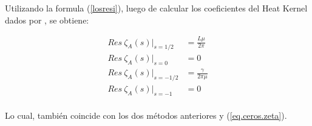 Utilizando la formula (\ref{losresi}), luego de calcular los coeficientes del Heat Kernel dados por \cite{VASSILEVICH2003279}, se obtiene:



\begin{equation}
\begin{aligned}
Res \  \zeta _A (s)  | _{s=1/2} &= \frac{L \mu}{2 \pi} \\[5pt]
Res \  \zeta _A (s)  | _{s=0} &= 0 \\[5pt]
Res \ \zeta _A (s) | _{s=-1/2} &= \frac{\gamma}{2 \pi \mu} \\[5pt]
Res \  \zeta _A (s) | _{s=-1} &= 0 \\[5pt]
\end{aligned}
\end{equation}


Lo cual, también coincide con los dos métodos anteriores y (\ref{eq.ceros.zeta}).
